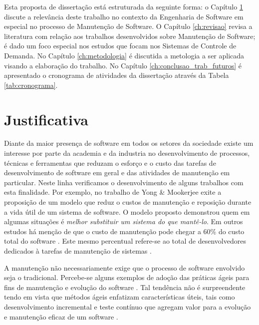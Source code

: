 \documentclass[msc,proposal,hidelot,hideabstract]{ppgccufmg} %
\begin{document}
Esta proposta de dissertação está estruturada da seguinte forma: o  Capítulo
\ref{ch:justificativa} discute a relevância deste trabalho no contexto da Engenharia de Software em especial no processo de Manutenção de
Software. O Capítulo \ref{ch:revisao} revisa a literatura com relação aos
trabalhos desenvolvidos sobre Manutenção de Software; é dado um foco especial
nos estudos que focam nos Sistemas de Controle de Demanda. No
Capítulo \ref{ch:metodologia} é discutida a metologia a ser aplicada visando a
elaboração do trabalho. No Capítulo \ref{ch:conclusao_trab_futuros} é apresentado o cronograma de
atividades da dissertação através da Tabela \ref{tab:cronograma}.

\chapter{Justificativa}
\label{ch:justificativa}
Diante da maior presença de software em todos os setores da sociedade
existe um interesse por parte da academia e da industria no desenvolvimento de
processos, técnicas e ferramentas que reduzam o esforço e o custo das tarefas
de desenvolvimento de software em geral e das atividades de manutenção em
particular. Neste linha verificamos o desenvolvimento de alguns trabalhos com
esta finalidade. Por exemplo, no trabalho de Yong \& Mookerjee \cite{1423995}  exite a proposição
de um modelo que reduz o custos de manutenção e reposição durante a vida útil de um sistema de software. O modelo
proposto demonstrou quem em algumas situações é \textit{melhor substituir um
  sistema do que mantê-lo}. Em outros estudos há menção de que o custo de
manutenção pode chegar a 60\% do custo total do software \cite{kaur2015review}. Este mesmo percentual
refere-se ao total de desenvolvedores dedicados à tarefas de manutenção de
sistemas \cite{Zhang_2003}.

A manutenção não necessariamente exige que o processo de software envolvido
seja o tradicional. Percebe-se alguns exemplos de adoção das práticas ágeis
para fins de manutenção e evolução do software \cite{kajko2009model}. Tal
tendência não é surpreendente tendo em vista que métodos ágeis enfatizam
características úteis, tais como desenvolvimento incremental e teste contínuo
que agregam valor para a evolução e manutenção eficaz de um software
\cite{thomas2006agile}.
\end{document}
